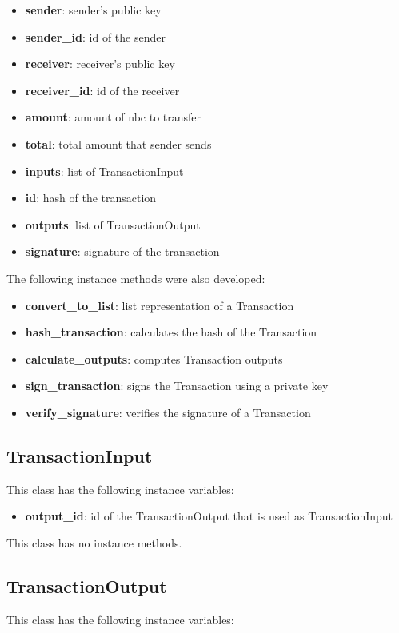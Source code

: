 \documentclass[conference]{IEEEtran}
\begin{document}
\begin{itemize}
\item \textbf{sender}: sender's public key
\item \textbf{sender\_id}: id of the sender
\item \textbf{receiver}: receiver's public key
\item \textbf{receiver\_id}: id of the receiver
\item \textbf{amount}: amount of nbc to transfer
\item \textbf{total}: total amount that sender sends
\item \textbf{inputs}: list of TransactionInput
\item \textbf{id}: hash of the transaction
\item \textbf{outputs}: list of TransactionOutput
\item \textbf{signature}: signature of the transaction
\end{itemize}

The following instance methods were also developed:

\begin{itemize}
\item \textbf{convert\_to\_list}: list representation of a Transaction
\item \textbf{hash\_transaction}: calculates the hash of the Transaction
\item \textbf{calculate\_outputs}: computes Transaction outputs
\item \textbf{sign\_transaction}: signs the Transaction using a private key
\item \textbf{verify\_signature}: verifies the signature of a Transaction
\end{itemize}

\subsection{TransactionInput}
This class has the following instance variables:

\begin{itemize}
\item \textbf{output\_id}: id of the TransactionOutput that is used as TransactionInput
\end{itemize}

This class has no instance methods.

\subsection{TransactionOutput}
This class has the following instance variables:
\end{document}
